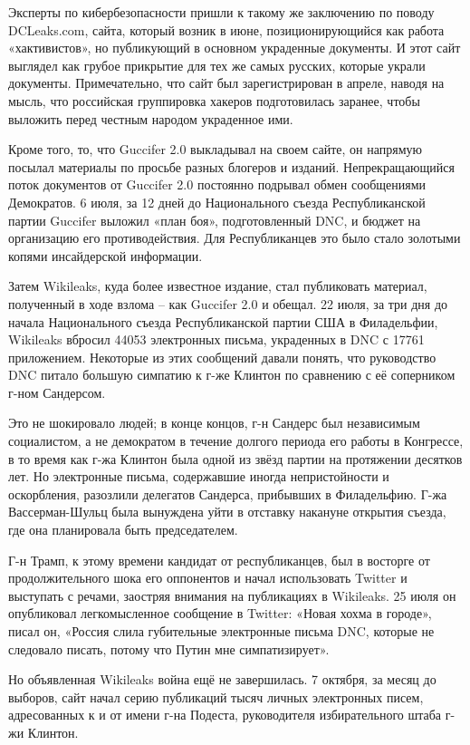 Эксперты по кибербезопасности пришли к такому же заключению по поводу
DCLeaks.com, сайта, который возник в июне, позиционирующийся как работа
«хактивистов», но публикующий в основном украденные документы. И этот
сайт выглядел как грубое прикрытие для тех же самых русских, которые
украли документы. Примечательно, что сайт был зарегистрирован в апреле,
наводя на мысль, что российская группировка хакеров подготовилась
заранее, чтобы выложить перед честным народом украденное ими.

Кроме того, то, что Guccifer 2.0 выкладывал на своем сайте, он напрямую
посылал материалы по просьбе разных блогеров и изданий. Непрекращающийся
поток документов от Guccifer 2.0 постоянно подрывал обмен сообщениями
Демократов. 6 июля, за 12 дней до Национального съезда Республиканской
партии Guccifer выложил «план боя», подготовленный DNC, и бюджет на
организацию его противодействия. Для Республиканцев это было стало
золотыми копями инсайдерской информации.

Затем Wikileaks, куда более известное издание, стал публиковать
материал, полученный в ходе взлома -- как Guccifer 2.0 и обещал. 22
июля, за три дня до начала Национального съезда Республиканской партии
США в Филадельфии, Wikileaks вбросил 44053 электронных письма,
украденных в DNC с 17761 приложением. Некоторые из этих сообщений давали
понять, что руководство DNC питало большую симпатию к г-же Клинтон по
сравнению с её соперником г-ном Сандерсом.

Это не шокировало людей; в конце концов, г-н Сандерс был независимым
социалистом, а не демократом в течение долгого периода его работы в
Конгрессе, в то время как г-жа Клинтон была одной из звёзд партии на
протяжении десятков лет. Но электронные письма, содержавшие иногда
непристойности и оскорбления, разозлили делегатов Сандерса, прибывших в
Филадельфию. Г-жа Вассерман-Шульц была вынуждена уйти в отставку
накануне открытия съезда, где она планировала быть председателем.

Г-н Трамп, к этому времени кандидат от республиканцев, был в восторге от
продолжительного шока его оппонентов и начал использовать Twitter и
выступать с речами, заостряя внимания на публикациях в Wikileaks. 25
июля он опубликовал легкомысленное сообщение в Twitter: «Новая хохма в
городе», писал он, «Россия слила губительные электронные письма DNC,
которые не следовало писать, потому что Путин мне симпатизирует».

Но объявленная Wikileaks война ещё не завершилась. 7 октября, за месяц
до выборов, сайт начал серию публикаций тысяч личных электронных писем,
адресованных к и от имени г-на Подеста, руководителя избирательного
штаба г-жи Клинтон.

